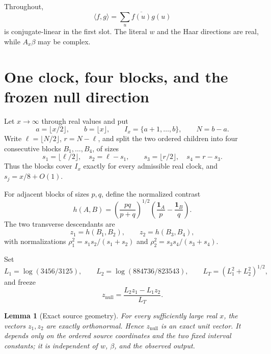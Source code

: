 \documentclass[10pt]{article}
\newtheorem{lemma}[theorem]{Lemma}
\newcommand{\one}{\mathbf 1}
\newcommand{\ip}[2]{\langle #1,#2\rangle}
\newcommand{\Ax}{A_x}
\newcommand{\znull}{z_{\mathrm{null}}}
\begin{document}
Throughout,
\[
 \ip{f}{g}=\sum_u\overline{f(u)}g(u)
\]
is conjugate-linear in the first slot.  The literal \(w\) and the Haar
directions are real, while \(\Ax\beta\) may be complex.

\section{One clock, four blocks, and the frozen null direction}

Let \(x\to\infty\) through real values and put
\begin{equation}
 a=\lfloor x/2\rfloor,\qquad b=\lfloor x\rfloor,
 \qquad I_x=\{a+1,\ldots,b\},\qquad N=b-a.              \label{eq:clock}
\end{equation}
Write \(\ell=\lfloor N/2\rfloor\), \(r=N-\ell\), and split the two
ordered children into four consecutive blocks \(B_1,\ldots,B_4\), of sizes
\begin{equation}
 s_1=\lfloor\ell/2\rfloor,\quad s_2=\ell-s_1,
 \qquad s_3=\lfloor r/2\rfloor,\quad s_4=r-s_3.          \label{eq:sizes}
\end{equation}
Thus the blocks cover \(I_x\) exactly for every admissible real clock, and
\(s_j=x/8+O(1)\).

For adjacent blocks of sizes \(p,q\), define the normalized contrast
\[
 h(A,B)=\left(\frac{pq}{p+q}\right)^{1/2}
 \left(\frac{\one_A}{p}-\frac{\one_B}{q}\right).
\]
The two transverse descendants are
\begin{equation}
 z_1=h(B_1,B_2),\qquad z_2=h(B_3,B_4),                  \label{eq:descendants}
\end{equation}
with normalizations
\(\rho_1^2=s_1s_2/(s_1+s_2)\) and
\(\rho_2^2=s_3s_4/(s_3+s_4)\).

Set
\begin{equation}
 L_1=\log(3456/3125),\qquad L_2=\log(884736/823543),
 \qquad L_T=(L_1^2+L_2^2)^{1/2},                       \label{eq:logs}
\end{equation}
and freeze
\begin{equation}
 \znull=\frac{L_2z_1-L_1z_2}{L_T}.                    \label{eq:null}
\end{equation}

\begin{lemma}[Exact source geometry]\label{lem:geometry}
For every sufficiently large real \(x\), the vectors \(z_1,z_2\) are
exactly orthonormal.  Hence \(\znull\) is an exact unit vector.  It depends
only on the ordered source coordinates and the two fixed interval constants;
it is independent of \(w\), \(\beta\), and the observed output.
\end{lemma}
\end{document}
